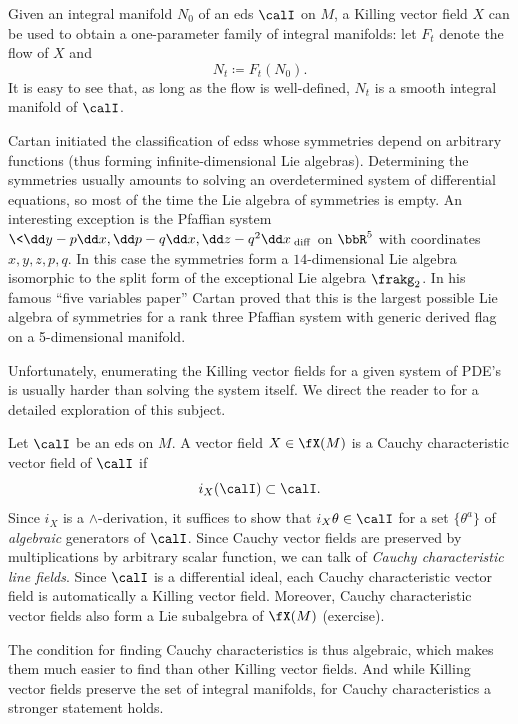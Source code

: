 Given an integral manifold $N_0$ of an \gls{eds} $\calI$ on $M$, a Killing vector field $X$ can be used to obtain a one-parameter family of integral manifolds: let $F_t$ denote the flow of $X$ and 
\[N_t\coloneqq F_t(N_0).\label{eq 7.3 Ivey}\]
It is easy to see that, as long as the flow is well-defined, $N_t$ is a smooth integral manifold of $\calI$. 

\begin{rem}
    Cartan initiated the classification of \glspl{eds} whose symmetries depend on arbitrary functions (thus forming infinite-dimensional Lie algebras). Determining the symmetries usually amounts to solving an overdetermined system of differential equations, so most of the time the Lie algebra of symmetries is empty. An interesting exception is the Pfaffian system $\<\dd y-p\dd x,\dd p-q\dd x,\dd z-q^2\dd x\>_{\mathrm{diff}}$ on $\bbR^5$ with coordinates $x,y,z,p,q$. In this case the symmetries form a $14$-dimensional Lie algebra isomorphic to the split form of the exceptional Lie algebra $\frakg_2$. In his famous ``five variables paper'' Cartan proved that this is the largest possible Lie algebra of symmetries for a rank three Pfaffian system with generic derived flag on a 5-dimensional manifold.
\end{rem}

Unfortunately, enumerating the Killing vector fields for a given system of PDE's is usually harder than solving the system itself. We direct the reader to \cite{Olver} for a detailed exploration of this subject.

\begin{defn}
    Let $\calI$ be an \gls{eds} on $M$. A vector field $X\in\fX(M)$ is a Cauchy characteristic vector field of $\calI$ if 
    \[i_X (\calI)\subset \calI.\]
    Since $i_X$ is a $\wedge$-derivation, it suffices to show that $i_X\theta\in\calI$ for a set $\{\theta^a\}$ of \emph{algebraic} generators of $\calI$. Since Cauchy vector fields are preserved by multiplications by arbitrary scalar function, we can talk of \emph{Cauchy characteristic line fields}. Since $\calI$ is a differential ideal, each Cauchy characteristic vector field is automatically a Killing vector field. Moreover, Cauchy characteristic vector fields also form a Lie subalgebra of $\fX(M)$ (exercise).
\end{defn}

The condition for finding Cauchy characteristics is thus algebraic, which makes them much easier to find than other Killing vector fields. And while Killing vector fields preserve the set of integral manifolds, for Cauchy characteristics a stronger statement holds.

